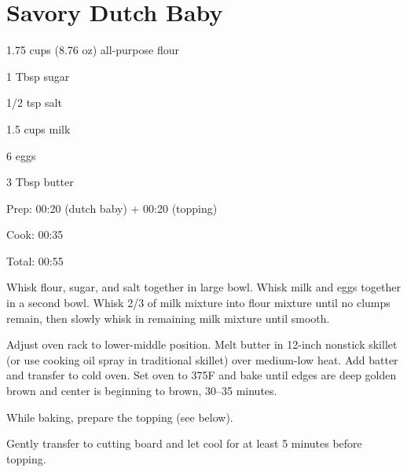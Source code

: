\documentclass[oneside]{book}  %
\def\thisrecipe{}  %
\newcommand{\recipe}[1]{\section{#1}\def\thisrecipe{: #1}} %
\newcommand{\degF}{\textdegree F\xspace}
\begin{document}
\recipe{Savory Dutch Baby} \label{recipe:savory_dutch_baby} %
\begin{IT}[0.727]
  \begin{ingredients}
    \item[1.75 cups (8.76 oz)] all-purpose flour
    \item[1 Tbsp] sugar
    \item[1/2 tsp] salt
    \item[1.5 cups] milk
    \item[6] eggs
    \item[3 Tbsp] butter
  \end{ingredients}

  \switchcolumn

  \begin{timeline}
    \item[Prep:]  00:20 (dutch baby) + 00:20 (topping)
    \item[Cook:]  00:35
    \item[Total:] 00:55
  \end{timeline}
\end{IT}

\begin{directions}
  \item Whisk flour, sugar, and salt together in large bowl. Whisk milk and eggs
  together in a second bowl. Whisk 2/3 of milk mixture into flour mixture until
  no clumps remain, then slowly whisk in remaining milk mixture until smooth.

  \item Adjust oven rack to lower-middle position. Melt butter in 12-inch
  nonstick skillet (or use cooking oil spray in traditional skillet) over
  medium-low heat. Add batter and transfer to cold oven. Set oven to 375\degF
  and bake until edges are deep golden brown and center is beginning to brown,
  30--35 minutes.

  \item While baking, prepare the topping (see below).

  \item Gently transfer to cutting board and let cool for at least 5 minutes
  before topping.
\end{directions}
\end{document}
